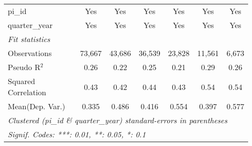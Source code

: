 \begin{tabular}{lcccccc}
   pi\_id                                                     & Yes           & Yes           & Yes           & Yes           & Yes           & Yes\\  
   quarter\_year                                              & Yes           & Yes           & Yes           & Yes           & Yes           & Yes\\  
   \midrule
   \emph{Fit statistics}\\
   Observations                                               & 73,667        & 43,686        & 36,539        & 23,828        & 11,561        & 6,673\\  
   Pseudo R$^2$                                               & 0.26          & 0.22          & 0.25          & 0.21          & 0.29          & 0.26\\  
   Squared Correlation                                        & 0.43          & 0.42          & 0.44          & 0.43          & 0.54          & 0.54\\  
Mean(Dep. Var.) & 0.335 & 0.486 & 0.416 & 0.554 & 0.397 & 0.577 \\
   \midrule \midrule
   \multicolumn{7}{l}{\emph{Clustered (pi\_id \& quarter\_year) standard-errors in parentheses}}\\
   \multicolumn{7}{l}{\emph{Signif. Codes: ***: 0.01, **: 0.05, *: 0.1}}\\
\end{tabular}
\par\endgroup
